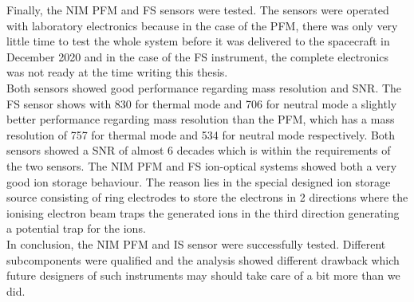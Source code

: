 	Finally, the NIM PFM and FS sensors were tested. The sensors were operated with laboratory electronics because in the case of the PFM, there was only very little time to test the whole system before it was delivered to the spacecraft in December 2020 and in the case of the FS instrument, the complete electronics was not ready at the time writing this thesis.\\
	Both sensors showed good performance regarding mass resolution and SNR. The FS sensor shows with 830 for thermal mode and 706 for neutral mode a slightly better performance regarding mass resolution than the PFM, which has a mass resolution of 757 for thermal mode and 534 for neutral mode respectively.	Both sensors showed a SNR of almost 6 decades which is within the requirements of the two sensors. The NIM PFM and FS ion-optical systems showed both a very good ion storage behaviour. The reason lies in the special designed ion storage source consisting of ring electrodes to store the electrons in 2 directions where the ionising electron beam traps the generated ions in the third direction generating a potential trap for the ions.\\
	
	In conclusion, the NIM PFM and IS sensor were successfully tested. Different subcomponents were qualified and the analysis showed different drawback which future designers of such instruments may should take care of a bit more than we did.
	
	
	
